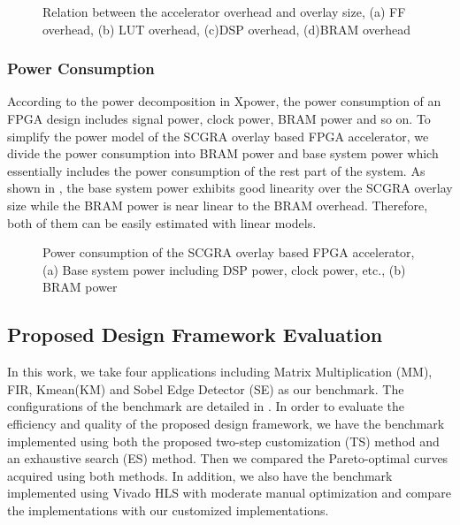 \begin{figure}[tb]
    \hfill
    \caption{Relation between the accelerator overhead and overlay size, 
    (a) FF overhead, (b) LUT overhead, (c)DSP overhead, (d)BRAM overhead}
    \label{fig:SCGRA-Overhead}
\end{figure}


\subsubsection{Power Consumption}
According to the power decomposition in Xpower, the power consumption 
of an FPGA design includes signal power, clock power, BRAM power and so on. 
To simplify the power model of the SCGRA overlay based FPGA accelerator, 
we divide the power consumption into BRAM power and base system 
power which essentially includes the power consumption of the rest part of the system. 
As shown in , the base system power exhibits good linearity 
over the SCGRA overlay size while the BRAM power is near linear to 
the BRAM overhead. Therefore, both of them can be easily estimated with linear models. 

\begin{figure}[tb]
    \caption{Power consumption of the SCGRA overlay based FPGA accelerator, 
    (a) Base system power including DSP power, clock power, etc., (b) BRAM power}
    \label{fig:SCGRA-Power}
\end{figure}

\subsection{Proposed Design Framework Evaluation}
In this work, we take four applications including Matrix Multiplication (MM), 
FIR, Kmean(KM) and Sobel Edge Detector (SE) as our benchmark. The 
configurations of the benchmark are detailed in . 
In order to evaluate the efficiency and quality of the proposed design 
framework, we have the benchmark implemented using both the proposed 
two-step customization (TS) method and an exhaustive search (ES) 
method. Then we compared the Pareto-optimal curves acquired 
using both methods. In addition, we also have the benchmark 
implemented using Vivado HLS with moderate manual optimization 
and compare the implementations with our customized implementations. 

